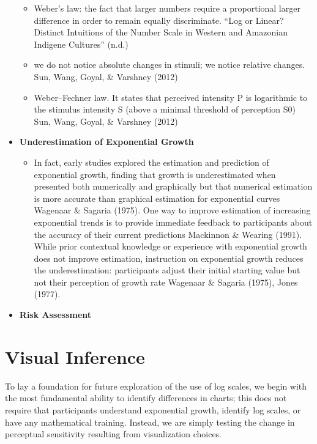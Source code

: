 \documentclass[print]{nuthesis}
\providecommand{\tightlist}{%
  \setlength{\itemsep}{0pt}\setlength{\parskip}{0pt}}
\begin{document}
\begin{itemize}
  \begin{itemize}
  \tightlist
  \item
    Weber's law: the fact that larger numbers require a proportional larger difference in order to remain equally discriminate. {``Log or {Linear}? {Distinct} {Intuitions} of the {Number} {Scale} in {Western} and {Amazonian} {Indigene} {Cultures}''} (n.d.)
  \item
    we do not notice absolute changes in stimuli; we notice relative changes. Sun, Wang, Goyal, \& Varshney (2012)
  \item
    Weber--Fechner law. It states that perceived intensity P is logarithmic to the stimulus intensity S (above a minimal threshold of perception S0) Sun, Wang, Goyal, \& Varshney (2012)
  \end{itemize}
\item
  \textbf{Underestimation of Exponential Growth}

  \begin{itemize}
  \tightlist
  \item
    In fact, early studies explored the estimation and prediction of exponential growth, finding that growth is underestimated when presented both numerically and graphically but that numerical estimation is more accurate than graphical estimation for exponential curves Wagenaar \& Sagaria (1975). One way to improve estimation of increasing exponential trends is to provide immediate feedback to participants about the accuracy of their current predictions Mackinnon \& Wearing (1991). While prior contextual knowledge or experience with exponential growth does not improve estimation, instruction on exponential growth reduces the underestimation: participants adjust their initial starting value but not their perception of growth rate Wagenaar \& Sagaria (1975), Jones (1977).
  \end{itemize}
\item
  \textbf{Risk Assessment}
\end{itemize}

\hypertarget{visual-inference}{%
\section{Visual Inference}\label{visual-inference}}

To lay a foundation for future exploration of the use of log scales, we begin with the most fundamental ability to identify differences in charts; this does not require that participants understand exponential growth, identify log scales, or have any mathematical training. Instead, we are simply testing the change in perceptual sensitivity resulting from visualization choices.
\end{document}
